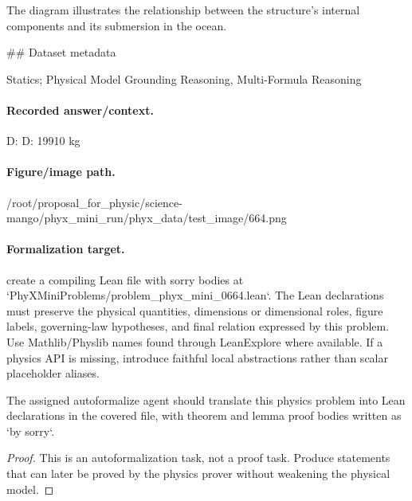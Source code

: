 The diagram illustrates the relationship between the structure's internal components and its submersion in the ocean.

\#\# Dataset metadata

Statics; Physical Model Grounding Reasoning, Multi-Formula Reasoning

\paragraph{Recorded answer/context.}
D: D: 19910 kg

\paragraph{Figure/image path.}
/root/proposal\_for\_physic/science-mango/phyx\_mini\_run/phyx\_data/test\_image/664.png

\paragraph{Formalization target.}
create a compiling Lean file with sorry bodies at `PhyXMiniProblems/problem\_phyx\_mini\_0664.lean`. The Lean declarations must preserve the physical quantities, dimensions or dimensional roles, figure labels, governing-law hypotheses, and final relation expressed by this problem.
Use Mathlib/Physlib names found through LeanExplore where available. If a physics API is missing, introduce faithful local abstractions rather than scalar placeholder aliases.

\begin{theorem}
\label{thm:physics:phyx_mini_0664:target}
The assigned autoformalize agent should translate this physics problem into Lean declarations in the covered file, with theorem and lemma proof bodies written as `by sorry`.
\end{theorem}
\begin{proof}
This is an autoformalization task, not a proof task. Produce statements that can later be proved by the physics prover without weakening the physical model.
\end{proof}

